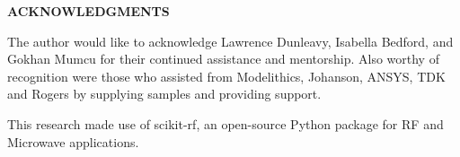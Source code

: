 \documentclass[12pt]{usfcoe}
\newcommand{\usfpagebreak}{\pagebreak\vspace*{0.5in}}
\begin{document}
\usfpagebreak
\thispagestyle{empty}
\pagestyle{empty}
\begin{center}
\textbf{ACKNOWLEDGMENTS}\\
\end{center}
	
The author would like to acknowledge Lawrence Dunleavy, Isabella Bedford, and Gokhan Mumcu for their continued assistance and mentorship.
Also worthy of recognition were those who assisted from Modelithics, Johanson, ANSYS, TDK and Rogers by supplying samples and providing support.
			
This research made use of scikit-rf, an open-source Python package for RF and Microwave applications.
\renewcommand{\cftdot}{}

\renewcommand{\cftlottitlefont}{\hspace*{\fill}\bfseries}
\renewcommand{\cftafterlottitle}{\hspace*{\fill}}
\renewcommand{\cftloftitlefont}{\hspace*{\fill}\bfseries}
\renewcommand{\cftafterloftitle}{\hspace*{\fill}}
\setlength\cftbeforefigskip{12pt}

\setlength{\belowcaptionskip}{0pt}


\usfpagebreak
\pagestyle{plain}
\setlength{\footskip}{.25in}



\renewcommand{\cfttoctitlefont}{\hspace*{\fill}\bfseries}
\renewcommand{\cftaftertoctitle}{\hspace*{\fill}}


\cftsetrmarg{.95in}
\end{document}

